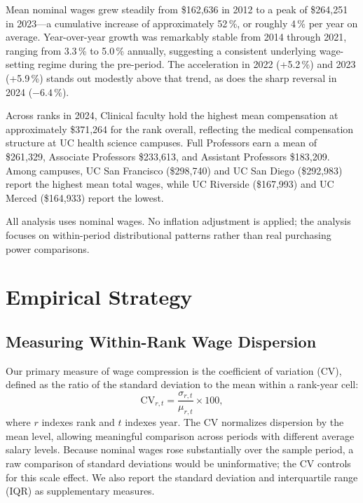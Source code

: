 \documentclass[12pt]{article}
\begin{document}
Mean nominal wages grew steadily from \$162,636 in 2012 to a peak of
\$264,251 in 2023---a cumulative increase of approximately 52\,\%, or
roughly 4\,\% per year on average. Year-over-year growth was remarkably
stable from 2014 through 2021, ranging from 3.3\,\% to 5.0\,\%
annually, suggesting a consistent underlying wage-setting regime during
the pre-period. The acceleration in 2022 (+5.2\,\%) and 2023 (+5.9\,\%)
stands out modestly above that trend, as does the sharp reversal in 2024
($-6.4$\,\%).

Across ranks in 2024, Clinical faculty hold the highest mean compensation
at approximately \$371,264 for the rank overall, reflecting the medical
compensation structure at UC health science campuses. Full Professors
earn a mean of \$261,329, Associate Professors \$233,613, and Assistant
Professors \$183,209. Among campuses, UC San Francisco (\$298,740) and
UC San Diego (\$292,983) report the highest mean total wages, while UC
Riverside (\$167,993) and UC Merced (\$164,933) report the lowest.

All analysis uses nominal wages. No inflation adjustment is applied;
the analysis focuses on within-period distributional patterns rather
than real purchasing power comparisons.

\section{Empirical Strategy}
\label{sec:methods}

\subsection{Measuring Within-Rank Wage Dispersion}

Our primary measure of wage compression is the coefficient of variation
(CV), defined as the ratio of the standard deviation to the mean within
a rank-year cell:
\begin{equation}
  \text{CV}_{r,t} = \frac{\sigma_{r,t}}{\mu_{r,t}} \times 100,
\end{equation}
where $r$ indexes rank and $t$ indexes year. The CV normalizes
dispersion by the mean level, allowing meaningful comparison across
periods with different average salary levels. Because nominal wages rose
substantially over the sample period, a raw comparison of standard
deviations would be uninformative; the CV controls for this scale effect.
We also report the standard deviation and interquartile range (IQR) as
supplementary measures.
\end{document}
